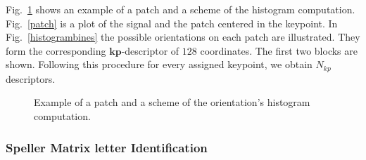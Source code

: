 \documentclass[entropy,article,submit,moreauthors,pdftex,10pt,a4paper]{mdpi}
\begin{document}
Fig.~\ref{fig:sampledescriptor} shows an example of a patch and a scheme of the histogram computation. Fig.~\ref{patch} is a plot of the signal and the patch centered in the keypoint. In Fig.~\ref{histogrambines} the possible orientations on each patch are illustrated. They form the corresponding $\mathbf{kp}$-descriptor of $128$ coordinates. The first two blocks are shown.  Following this procedure for every assigned keypoint, we obtain $N_{kp}$ descriptors.
 

 
\begin{figure}[H]
\centering
{}
\caption{ Example of a patch and a scheme of the orientation's histogram computation.}
\label{fig:sampledescriptor}
\end{figure}

\subsubsection{Speller Matrix letter Identification}
\label{Classification}

\end{document}
